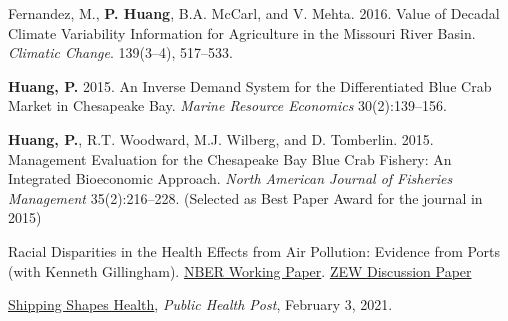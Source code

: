 \begin{pubitems}
    \item {Fernandez, M., {\bf P. Huang}, B.A. McCarl, and V. Mehta. 2016. Value of Decadal Climate Variability Information for Agriculture in the Missouri River Basin. \textit{Climatic Change}. 139(3--4), 517--533.}
    \item {\textbf{Huang, P.} 2015. An Inverse Demand System for the Differentiated Blue Crab Market in Chesapeake Bay. {\itshape Marine Resource Economics} 30(2):139--156.}
    \item {\textbf{Huang, P.}, R.T. Woodward, M.J. Wilberg, and D. Tomberlin. 2015. Management Evaluation for the Chesapeake Bay Blue Crab Fishery: An Integrated Bioeconomic Approach. {\itshape North American Journal of Fisheries Management} 35(2):216--228. (Selected as Best Paper Award for the journal in 2015)}
\end{pubitems}



\begin{pubitems} %
    \item {Racial Disparities in the Health Effects from Air Pollution: Evidence from Ports (with Kenneth Gillingham). \href{https://www.nber.org/papers/w29108}{NBER Working Paper}. \href{https://www.zew.de/en/publications/racial-disparities-in-the-health-effects-from-air-pollution-evidence-from-ports-1}{ZEW Discussion Paper}}
\end{pubitems}




\begin{pubitems} %
    \item {\href{https://www.publichealthpost.org/research/shipping-shapes-health/}{Shipping Shapes Health}, \textit{Public Health Post}, February 3, 2021.}
\end{pubitems}


